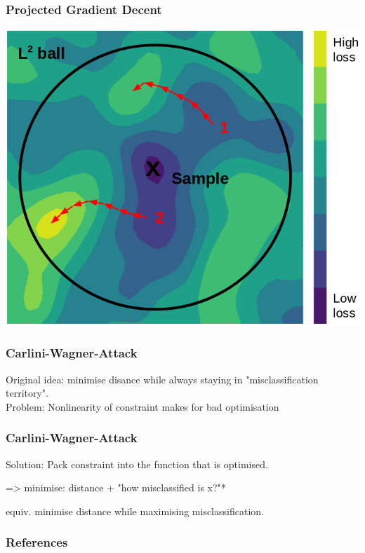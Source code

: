 \documentclass[10pt,usepdftitle=false,aspectratio=169]{beamer}
\begin{document}
\begin{frame}[fragile]
	\frametitle{Projected Gradient Decent}
	
	\includegraphics[height=0.8 \textheight]{plots/pgd_pic.png}
	
\end{frame}


\begin{frame}[fragile]
	\frametitle{Carlini-Wagner-Attack}
	
	Original idea: minimise disance while always staying in "misclassification territory".
	\\
	Problem: Nonlinearity of constraint makes for bad optimisation
	
\end{frame}

\begin{frame}[fragile]
	\frametitle{Carlini-Wagner-Attack}
	
	Solution: Pack constraint into the function that is optimised.
	
	=> minimise: distance + "how misclassified is x?"*
	
	equiv. minimise distance while maximising misclassification.
	
\end{frame}

\begin{frame}[allowframebreaks]
	\frametitle{References}
	
	
\end{frame}
\end{document}
